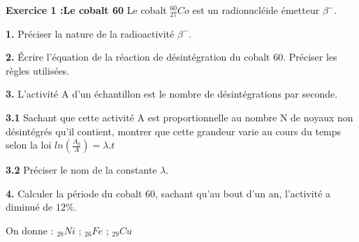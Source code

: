 \documentclass[12pt, french]{article}
\begin{document}
\begin{center}
\end{center}

\vspace{-0.2cm}



\begin{Box2}{\textbf{Exercice 1 :Le cobalt 60 }
	}
	Le cobalt $_{27}^{60}Co$ est un radionucléide émetteur $\beta^-$.

	\textbf{1. }Préciser la nature de la radioactivité $\beta^-$.
	
	\textbf{2. } Écrire l’équation de la réaction de désintégration du cobalt 60. Préciser les règles utilisées.

	\textbf{3. } L’activité A d’un échantillon est le nombre de désintégrations par seconde.

\textbf{3.1 }Sachant que cette activité A est proportionnelle au nombre N de noyaux non désintégrés qu’il contient, montrer que cette grandeur varie au cours du temps selon la loi $ln(\frac{A_0}{A}) = \lambda.t$

	\textbf{3.2 }Préciser le nom de la constante $\lambda$.

	\textbf{4. } Calculer la période du cobalt 60, sachant qu'au bout d'un an, l'activité a diminué de $12\%$.

	On donne : $_{28}Ni$ ; $_{26}Fe$ ; $_{29}Cu$

\end{Box2}
\end{document}
